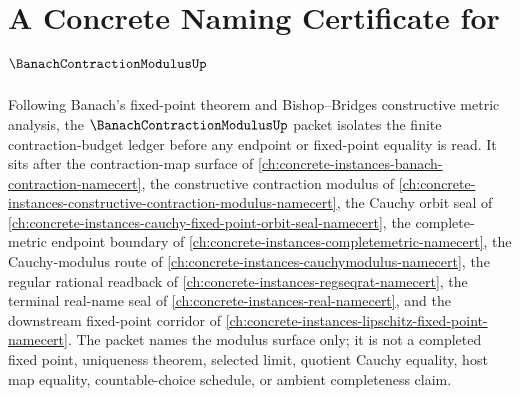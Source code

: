 \chapter{A Concrete Naming Certificate for $\BanachContractionModulusUp$}
\label{ch:concrete-instances-banach-contraction-modulus-namecert}

Following Banach's fixed-point theorem and Bishop--Bridges constructive metric analysis, the $\BanachContractionModulusUp$ packet isolates the finite contraction-budget ledger before any endpoint or fixed-point equality is read. It sits after the contraction-map surface of \autoref{ch:concrete-instances-banach-contraction-namecert}, the constructive contraction modulus of \autoref{ch:concrete-instances-constructive-contraction-modulus-namecert}, the Cauchy orbit seal of \autoref{ch:concrete-instances-cauchy-fixed-point-orbit-seal-namecert}, the complete-metric endpoint boundary of \autoref{ch:concrete-instances-completemetric-namecert}, the Cauchy-modulus route of \autoref{ch:concrete-instances-cauchymodulus-namecert}, the regular rational readback of \autoref{ch:concrete-instances-regseqrat-namecert}, the terminal real-name seal of \autoref{ch:concrete-instances-real-namecert}, and the downstream fixed-point corridor of \autoref{ch:concrete-instances-lipschitz-fixed-point-namecert}. The packet names the modulus surface only; it is not a completed fixed point, uniqueness theorem, selected limit, quotient Cauchy equality, host map equality, countable-choice schedule, or ambient completeness claim.

